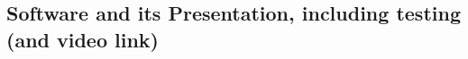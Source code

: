 \documentclass[a4paper]{article}
\begin{document}





%             
%             




\pagebreak




\pagebreak
\subsection{Software and its Presentation, including testing (and video link)}
\end{document}

